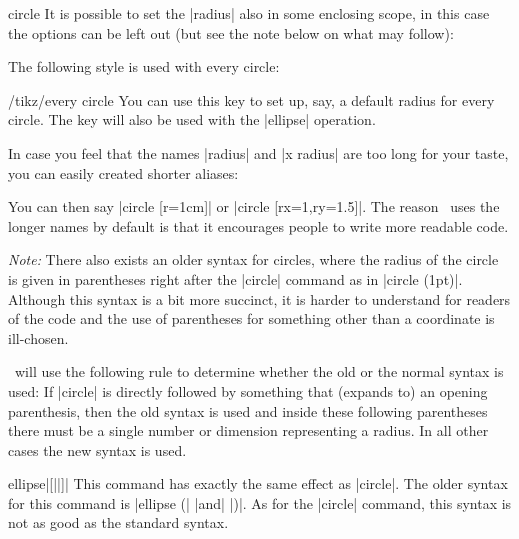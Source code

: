 \begin{pathoperation}{circle}{}
    It is possible to set the |radius| also in some enclosing scope, in this
    case the options can be left out (but see the note below on what may
    follow):
\begin{codeexample}[]
\end{codeexample}

    The following style is used with every circle:
    \begin{stylekey}{/tikz/every circle}
        You can use this key to set up, say, a default radius for every circle.
        The key will also be used with the |ellipse| operation.
    \end{stylekey}

    In case you feel that the names |radius| and |x radius| are too long for
    your taste, you can easily created shorter aliases:
\begin{codeexample}
\end{codeexample}
    You can then say |circle [r=1cm]| or |circle [rx=1,ry=1.5]|. The reason
    \tikzname\ uses the longer names by default is that it encourages people to
    write more readable code.

    \emph{Note:} There also exists an older syntax for circles, where the
    radius of the circle is given in parentheses right after the |circle|
    command as in |circle (1pt)|. Although this syntax is a bit more succinct,
    it is harder to understand for readers of the code and the use of
    parentheses for something other than a coordinate is ill-chosen.

    \tikzname\ will use the following rule to determine whether the old or the
    normal syntax is used: If |circle| is directly followed by something that
    (expands to) an opening parenthesis, then the old syntax is used and inside
    these following parentheses there must be a single number or dimension
    representing a radius. In all other cases the new syntax is used.
\end{pathoperation}

\begin{pathoperation}{ellipse}{|[||]|}
    This command has exactly the same effect as |circle|. The older syntax for
    this command is |ellipse (| |and| |)|. As for
    the |circle| command, this syntax is not as good as the standard syntax.
\begin{codeexample}[]
\end{codeexample}
\end{pathoperation}


